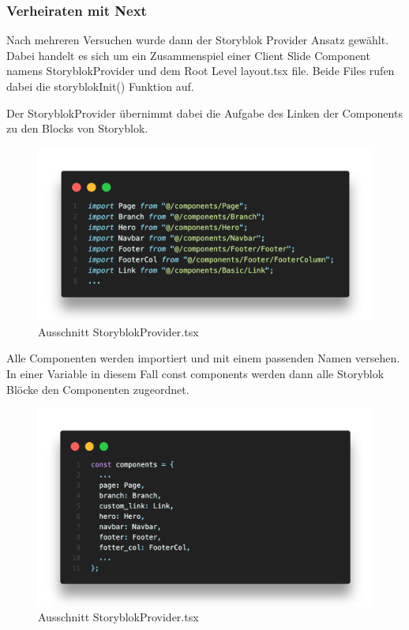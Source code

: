 \subsubsection*{Verheiraten mit Next}
Nach mehreren Versuchen wurde dann der Storyblok Provider Ansatz gewählt. Dabei handelt es sich um ein Zusammenspiel einer Client Slide Component namens StoryblokProvider und dem Root Level layout.tsx file. Beide Files rufen dabei die storyblokInit() Funktion auf. 

Der StoryblokProvider übernimmt dabei die Aufgabe des Linken der Components zu den Blocks von Storyblok.

\begin{figure}[H]
    \centering
    \includegraphics[width=\linewidth]{pics/sb-provider-01.png}
    \caption{Ausschnitt StoryblokProvider.tsx}
\end{figure}

Alle Componenten werden importiert und mit einem passenden Namen versehen. In einer Variable in diesem Fall const components werden dann alle Storyblok Blöcke den Componenten zugeordnet.

\begin{figure}[H]
    \centering
    \includegraphics[width=\linewidth]{pics/sb-provider-02.png}
    \caption{Ausschnitt StoryblokProvider.tsx}
\end{figure}


